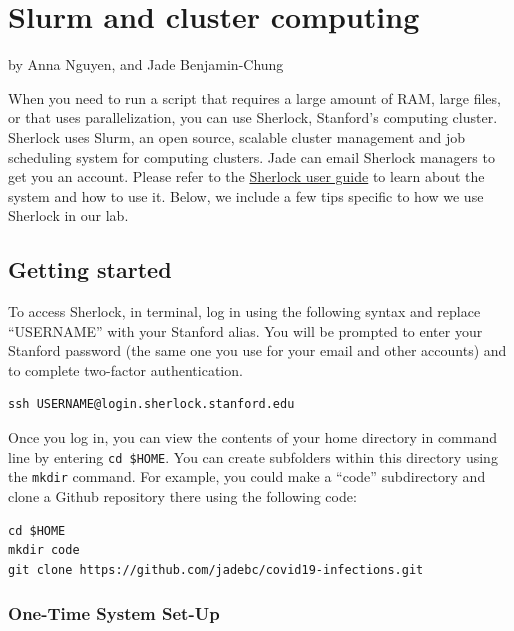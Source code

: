 \documentclass[
]{book}
\begin{document}
\hypertarget{slurm}{%
\chapter{Slurm and cluster computing}\label{slurm}}

by Anna Nguyen, and Jade Benjamin-Chung

When you need to run a script that requires a large amount of RAM, large files, or that uses parallelization, you can use Sherlock, Stanford's computing cluster. Sherlock uses Slurm, an open source, scalable cluster management and job scheduling system for computing clusters. Jade can email Sherlock managers to get you an account. Please refer to the \href{https://www.sherlock.stanford.edu/docs/overview/introduction/}{Sherlock user guide} to learn about the system and how to use it. Below, we include a few tips specific to how we use Sherlock in our lab.

\hypertarget{getting-started}{%
\section{Getting started}\label{getting-started}}

To access Sherlock, in terminal, log in using the following syntax and replace ``USERNAME'' with your Stanford alias. You will be prompted to enter your Stanford password (the same one you use for your email and other accounts) and to complete two-factor authentication.

\begin{verbatim}
ssh USERNAME@login.sherlock.stanford.edu
\end{verbatim}

Once you log in, you can view the contents of your home directory in command line by entering \texttt{cd\ \$HOME}. You can create subfolders within this directory using the \texttt{mkdir} command. For example, you could make a ``code'' subdirectory and clone a Github repository there using the following code:

\begin{verbatim}
cd $HOME
mkdir code
git clone https://github.com/jadebc/covid19-infections.git
\end{verbatim}

\hypertarget{one-time-system-set-up}{%
\subsection{One-Time System Set-Up}\label{one-time-system-set-up}}
\end{document}
